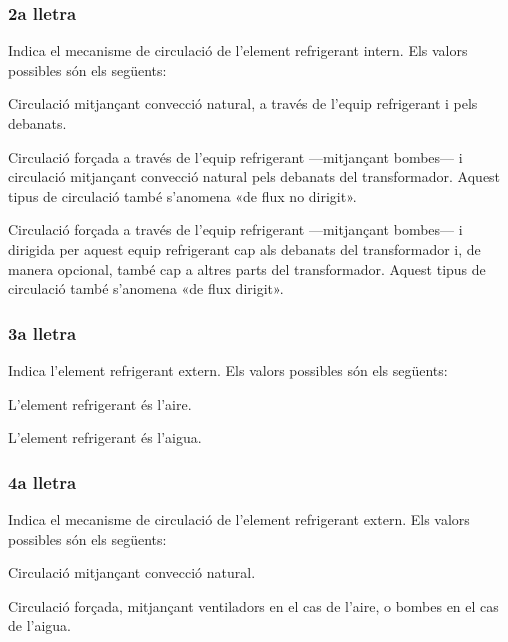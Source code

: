 \subsubsection*{2a lletra}
Indica el mecanisme de circulació de l'element
refrigerant intern. Els valors possibles són els següents:

\begin{list}{}
   {\setlength{\labelwidth}{10mm} \setlength{\leftmargin}{10mm} \setlength{\labelsep}{2mm}}
   \item[\textbf{N}] Circulació mitjançant convecció natural,
    a través de l'equip refrigerant i pels debanats.
   \item[\textbf{F}] Circulació forçada a través de l'equip refrigerant ---mitjançant bombes---
    i circulació mitjançant convecció natural pels debanats del
    transformador. Aquest tipus de circulació també s'anomena «de flux no
    dirigit».
   \item[\textbf{D}] Circulació forçada a través de l'equip refrigerant ---mitjançant bombes---
    i dirigida per aquest equip refrigerant cap als debanats del
    transformador i, de manera opcional, també cap a altres parts del transformador. Aquest
    tipus de circulació també s'anomena «de flux dirigit».
\end{list}
  

\subsubsection*{3a lletra}
 Indica l'element refrigerant extern. Els valors
possibles són els següents:

\begin{list}{}
   {\setlength{\labelwidth}{10mm} \setlength{\leftmargin}{10mm} \setlength{\labelsep}{2mm}}
   \item[\textbf{A}] L'element refrigerant és l'aire.
   \item[\textbf{W}] L'element refrigerant és l'aigua.
\end{list}
 

\subsubsection*{4a lletra}
 Indica el mecanisme de circulació de l'element
refrigerant extern. Els valors possibles són els següents:
\begin{list}{}
   {\setlength{\labelwidth}{10mm} \setlength{\leftmargin}{10mm} \setlength{\labelsep}{2mm}}
   \item[\textbf{N}] Circulació mitjançant convecció natural.
   \item[\textbf{F}] Circulació forçada, mitjançant ventiladors en el cas de
   l'aire, o bombes en el cas de l'aigua.
\end{list}
 

